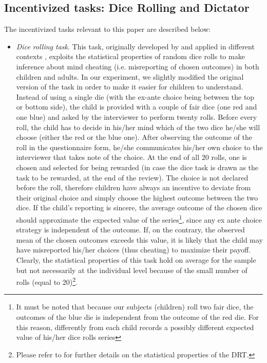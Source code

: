 \documentclass[authoryear, preprint, review, 12pt]{elsarticle}
\begin{document}
\subsection{Incentivized tasks: Dice Rolling and Dictator}
\label{subsec:IncTask}
The incentivized tasks relevant to this paper are described below:
\begin{itemize}
\item \textit{Dice rolling task}. This task, originally developed by \citet{ff13} and applied in different contexts \citep[e.g.][]{ariely2015true}, exploits the statistical properties of random dice rolls to make inference about mind cheating (i.e. misreporting of chosen outcomes) in both children and adults.
In our experiment, we slightly modified the original version of the task in order to make it easier for children to understand. Instead of using a single die (with the ex-ante choice being between the top or bottom side), the child is provided with a couple of fair dice (one red and one blue) and asked by the interviewer to perform twenty rolls. Before every roll, the child has to decide in his/her mind which of the two dice he/she will choose (either the red or the blue one). After observing the outcome of the roll in the questionnaire form, he/she communicates his/her own choice to the interviewer that takes note of the choice. At the end of all 20 rolls, one is chosen and selected for being rewarded (in case the dice task is drawn as the task to be rewarded, at the end of the review). The choice is not declared before the roll, therefore children have always an incentive to deviate from their original choice and simply choose the highest outcome between the two dice. If the child's reporting is sincere, the average outcome of the chosen dice should approximate the expected value of the series\footnote{It must be noted that because our subjects (children) roll two fair dice, the outcomes of the blue die is independent from the outcome of the red die. For this reason, differently from \citet{ariely2015true,ff13} each child records a possibly different expected value of his/her dice rolls series}, since any ex ante choice strategy is independent of the outcome. If, on the contrary, the observed mean of the chosen outcomes exceeds this value, it is likely that the child may have misreported  his/her choices (thus cheating) to maximize their payoff. Clearly, the statistical properties of this task hold on average for the sample but not necessarily at the individual level because of the small number of rolls (equal to 20)\footnote{Please refer to \citet{ariely2015true} for further details on the statistical properties of the DRT.}.


\end{itemize}
\end{document}
